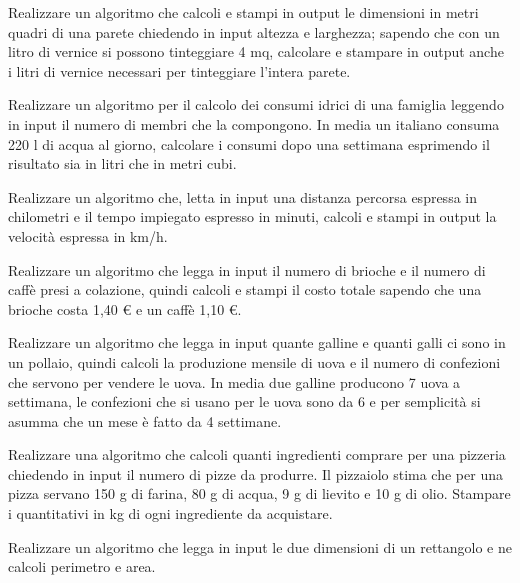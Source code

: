 \begin{exercise}
	Realizzare un algoritmo che calcoli e stampi in output le dimensioni in metri quadri di una parete chiedendo in input altezza e larghezza; sapendo che con un litro di vernice si possono tinteggiare 4 mq, calcolare e stampare in output anche i litri di vernice necessari per tinteggiare l'intera parete.
\end{exercise}

\begin{exercise}
	Realizzare un algoritmo per il calcolo dei consumi idrici di una famiglia leggendo in input il numero di membri che la compongono. In media un italiano consuma 220 l di acqua al giorno, calcolare i consumi dopo una settimana esprimendo il risultato sia in litri che in metri cubi.
\end{exercise}

\begin{exercise}
	Realizzare un algoritmo che, letta in input una distanza percorsa espressa in chilometri e il tempo impiegato espresso in minuti, calcoli e stampi in output la velocità espressa in km/h.
\end{exercise}

\begin{exercise}
	Realizzare un algoritmo che legga in input il numero di brioche e il numero di caffè presi a colazione, quindi calcoli e stampi il costo totale sapendo che una brioche costa 1,40 € e un caffè 1,10 €.
\end{exercise}

\begin{exercise}
	Realizzare un algoritmo che legga in input quante galline e quanti galli ci sono in un pollaio, quindi calcoli la produzione mensile di uova e il numero di confezioni che servono per vendere le uova. In media due galline producono 7 uova a settimana, le confezioni che si usano per le uova sono da 6 e per semplicità si asumma che un mese è fatto da 4 settimane.
\end{exercise}

\begin{exercise}
	Realizzare una algoritmo che calcoli quanti ingredienti comprare per una pizzeria chiedendo in input il numero di pizze da produrre. Il pizzaiolo stima che per una pizza servano 150 g di farina, 80 g di acqua, 9 g di lievito e 10 g di olio. Stampare i quantitativi in kg di ogni ingrediente da acquistare.
\end{exercise}

\begin{exercise}
	Realizzare un algoritmo che legga in input le due dimensioni di un rettangolo e ne calcoli perimetro e area.
\end{exercise}


